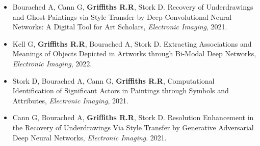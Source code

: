 \documentclass[11pt]{article}
\begin{document}


\begin{itemize}

\item Bourached A, Cann G, \textbf{Griffiths R.R}, Stork D. Recovery of Underdrawings and Ghost-Paintings via Style Transfer by Deep Convolutional Neural Networks: A Digital Tool for Art Scholars, \textit{Electronic Imaging}, 2021.

\end{itemize}
 


\begin{itemize}

\item Kell G, \textbf{Griffiths R.R}, Bourached A, Stork D. Extracting Associations and Meanings of Objects Depicted in Artworks through Bi-Modal Deep Networks, \textit{Electronic Imaging}, 2022.

\end{itemize}
 


\begin{itemize}

\item Stork D, Bourached A, Cann G, \textbf{Griffiths R.R}, Computational Identification of Significant Actors in Paintings through Symbols and Attributes, \textit{Electronic Imaging}, 2021.

\end{itemize}
 


\begin{itemize}

\item Cann G, Bourached A, \textbf{Griffiths R.R}, Stork D. Resolution Enhancement in the Recovery of Underdrawings Via Style Transfer by Generative Adversarial Deep Neural Networks, \textit{Electronic Imaging}. 2021.

\end{itemize}
 
\end{document}
